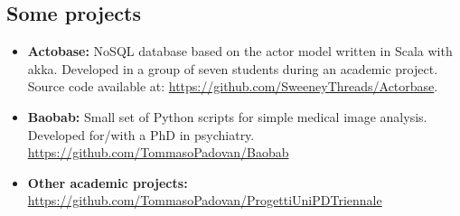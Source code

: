 \documentclass[letterpaper]{twentysecondcv} %
\begin{document}
\subsection{Some projects}
\small
\begin{itemize}[noitemsep,nolistsep]
	\item \textbf{Actobase:} NoSQL database based on the actor model written in Scala with akka. Developed in a group of seven students during an academic project. Source code available at: \url{https://github.com/SweeneyThreads/Actorbase}.
	\item \textbf{Baobab:} Small set of Python scripts for simple medical image analysis. Developed for/with a PhD in psychiatry. \url{https://github.com/TommasoPadovan/Baobab}
	\item \textbf{Other academic projects:} \\\url{https://github.com/TommasoPadovan/ProgettiUniPDTriennale}
\end{itemize}

\tiny
{}






\end{document}
